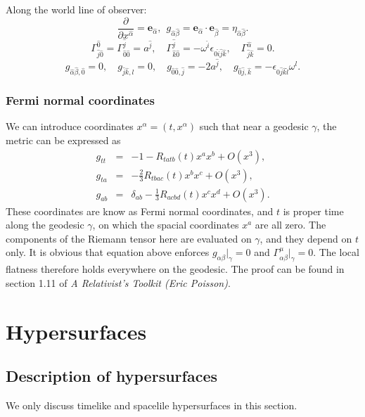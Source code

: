 \noindent
Along the world line of observer:
\[\frac{\partial}{\partial x^{\hat{\alpha}}} = \bm{e}_{\hat{\alpha}}, \ \ g_{\hat{\alpha} \hat{\beta}} = \bm{e}_{\hat{\alpha}} \cdot \bm{e}_{\hat{\beta}} = \eta_{\hat{\alpha}\hat{\beta}}.\]
\[\Gamma^{\hat{0}}_{\hat{j} \hat{0}} = \Gamma^{\hat{j}}_{\hat{0} \hat{0}} = a^{\hat{j}}
, \quad \Gamma^{\hat{j}}_{\hat{k} \hat{0}} = -\omega^{\hat{i}} \epsilon_{0 \hat{i} \hat{j} \hat{k}}, \quad \Gamma^{\hat{\alpha}}_{\hat{j} \hat{k}} = 0 .\]
\[g_{\hat{\alpha} \hat{\beta},\hat{0}} = 0, \quad g_{\hat{j} \hat{k},\hat{l}} = 0, \quad
g_{\hat{0} \hat{0},\hat{j}} = -2 a^{\hat{j}}, \quad 
g_{\hat{0} \hat{j},\hat{k}} = -\epsilon_{0 \hat{j} \hat{k} \hat{l}} \omega^{\hat{l}}
.\]

\subsubsection{Fermi normal coordinates}
We can introduce coordinates $x^{\alpha} = (t,x^{\alpha})$ such that near a geodesic $\gamma$, the metric can be expressed as
\begin{eqnarray}
g_{tt} &=& -1 - R_{tatb}(t)x^a x^b + O(x^3), \nonumber \\
g_{ta} &=&  - \frac{2}{3} R_{tbac}(t)x^b x^c + O(x^3), \nonumber \\
g_{ab} &=& \delta_{ab} - \frac{1}{3} R_{acbd}(t)x^c x^d + O(x^3). \nonumber
\end{eqnarray}
These coordinates are know as Fermi normal coordinates, and $t$ is proper time along the geodesic $\gamma$, on which the spacial coordinates $x^a$ are all zero. The components of the Riemann tensor here are evaluated on $\gamma$, and they depend on $t$ only. It is obvious that equation above enforces $g_{\alpha\beta}|_{\gamma} = 0$ and $\Gamma^{\mu}_{\alpha\beta} |_{\gamma} = 0$. The local flatness therefore holds everywhere on the geodesic.  The proof can be found in section 1.11 of \emph{A Relativist's Toolkit (Eric Poisson)}.

\section{Hypersurfaces}
\subsection{Description of hypersurfaces}
\begin{note}
We only discuss timelike and spacelile hypersurfaces in this section.
\end{note}
